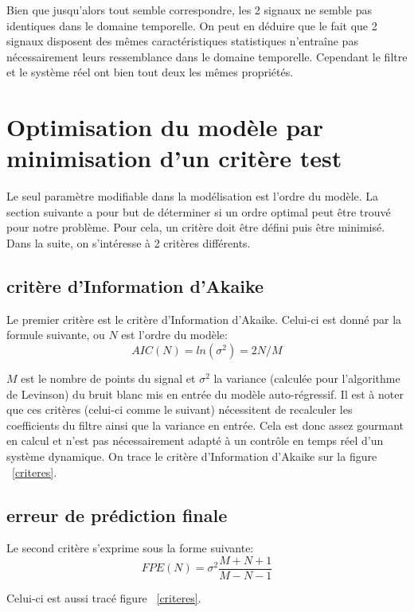 \documentclass[a4paper]{article}
\begin{document}
Bien que jusqu'alors tout semble correspondre, les 2 signaux ne semble pas identiques dans le domaine temporelle. On peut en déduire que le fait que 2 signaux disposent des mêmes caractéristiques statistiques n'entraîne pas nécessairement leurs ressemblance dans le domaine temporelle. Cependant le filtre et le système réel ont bien tout deux les mêmes propriétés. 

\section{Optimisation du modèle par minimisation d'un critère test}
Le seul paramètre modifiable dans la modélisation est l'ordre du modèle. La section suivante a pour but de déterminer si un ordre optimal peut être trouvé pour notre problème. Pour cela, un critère doit être défini puis être minimisé. Dans la suite, on s'intéresse à 2 critères différents.


\subsection{critère d'Information d'Akaike}
Le premier critère est le critère d'Information d'Akaike. Celui-ci est donné par la formule suivante, ou $N$ est l'ordre du modèle:
\begin{equation}
AIC(N) = ln(\sigma ^2) = 2 N/M
\end{equation}

$M$ est le nombre de points du signal et $\sigma ^2$ la variance (calculée pour l'algorithme de Levinson) du bruit blanc mis en entrée du modèle auto-régressif. Il est à noter que ces critères (celui-ci comme le suivant) nécessitent de recalculer les coefficients du filtre ainsi que la variance en entrée. Cela est donc assez gourmant en calcul et n'est pas nécessairement adapté à un contrôle en temps réel d'un système dynamique.
On trace le critère d'Information d'Akaike sur la figure ~\ref{criteres}.

\subsection{erreur de prédiction finale}
Le second critère s'exprime sous la forme suivante:
\begin{equation}
FPE(N) = \sigma ^2 \frac{M+N+1}{M-N-1}
\end{equation}

Celui-ci est aussi tracé figure ~\ref{criteres}.
\end{document}
